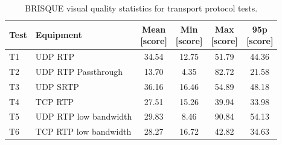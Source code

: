\begin{table}[H]
    \centering
    \caption{BRISQUE visual quality statistics for transport protocol tests.}\label{tab:quality_transport}
    \begin{tabular}{|l|l|c|c|c|c|}
    \hline
    \textbf{Test} & \textbf{Equipment} & \shortstack{\textbf{Mean}\\ \textbf{[score]}} & \shortstack{\textbf{Min}\\ \textbf{[score]}} & \shortstack{\textbf{Max}\\ \textbf{[score]}} & \shortstack{\textbf{95p}\\ \textbf{[score]}}\\
    \hline
    T1 & UDP RTP & 34.54 & 12.75 & 51.79 & 44.36\\
    \hline
    T2 & UDP RTP Passthrough & 13.70 & 4.35 & 82.72 & 21.58\\
    \hline
    T3 & UDP SRTP & 36.16 & 16.46 & 54.89 & 48.18\\
    \hline
    T4 & TCP RTP & 27.51 & 15.26 & 39.94 & 33.98\\
    \hline
    T5 & UDP RTP low bandwidth & 29.83 & 8.46 & 90.84 & 54.13\\
    \hline
    T6 & TCP RTP low bandwidth & 28.27 & 16.72 & 42.82 & 34.63\\
    \hline
    \end{tabular}
\end{table}
